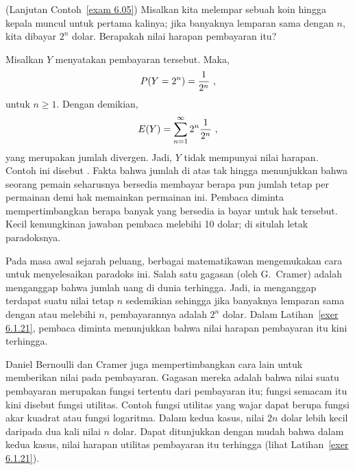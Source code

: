 \begin{example}(Lanjutan Contoh~\ref{exam 6.05})\label{exam 6.055} Misalkan kita
melempar sebuah koin hingga kepala muncul untuk pertama kalinya; jika banyaknya
lemparan sama dengan $n$, kita dibayar $2^n$ dolar. Berapakah nilai harapan pembayaran
itu?
\par Misalkan $Y$ menyatakan pembayaran tersebut. Maka,
$$P(Y = 2^n) = {1\over{2^n}}\ ,$$ untuk $n \ge 1$. Dengan demikian,
$$E(Y) = \sum_{n = 1}^\infty 2^n {1\over{2^n}}\ ,$$ yang merupakan jumlah divergen.
Jadi, $Y$ tidak mempunyai nilai harapan. Contoh ini disebut .
Fakta bahwa jumlah di atas tak hingga menunjukkan bahwa seorang pemain seharusnya
bersedia membayar berapa pun jumlah tetap per permainan demi hak memainkan permainan
ini. Pembaca diminta mempertimbangkan berapa banyak yang bersedia ia bayar untuk hak
tersebut. Kecil kemungkinan jawaban pembaca melebihi 10 dolar; di situlah letak
paradoksnya.
\par Pada masa awal sejarah peluang, berbagai matematikawan mengemukakan cara untuk
menyelesaikan paradoks ini. Salah satu gagasan (oleh G.~Cramer)
adalah menganggap bahwa jumlah uang di dunia terhingga. Jadi, ia menganggap terdapat
suatu nilai tetap $n$ sedemikian sehingga jika banyaknya lemparan sama dengan atau
melebihi $n$, pembayarannya adalah $2^n$ dolar. Dalam Latihan~\ref{exer 6.1.21},
pembaca diminta menunjukkan bahwa nilai harapan pembayaran itu kini terhingga.
\par Daniel Bernoulli dan Cramer juga mempertimbangkan cara lain
untuk memberikan nilai pada pembayaran. Gagasan mereka adalah bahwa nilai suatu
pembayaran merupakan fungsi tertentu dari pembayaran itu; fungsi semacam itu kini
disebut fungsi utilitas. Contoh fungsi utilitas yang wajar dapat
berupa fungsi akar kuadrat atau fungsi logaritma. Dalam kedua kasus, nilai $2n$ dolar
lebih kecil daripada dua kali nilai $n$ dolar. Dapat ditunjukkan dengan mudah bahwa
dalam kedua kasus, nilai harapan utilitas pembayaran itu terhingga (lihat
Latihan~\ref{exer 6.1.21}).
\end{example}

